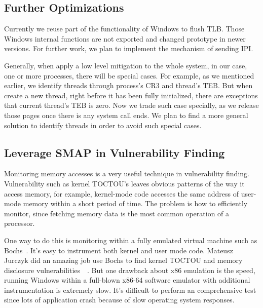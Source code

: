 \begin{comment}
Well known facts about paging on x86 architecture, for each thread, the root of page tables is stored in CR3, by which CPU can translate virtual-physical page mappings automatically in hardware. CR3 are updated by OS thread scheduling code during thread switching. Since we don't want to modify the target operating system, we can use hypervisor to monitoring thread switching events just like what we did for process context switching. There is no direct VM exit event that represent thread switching, but indirectly OS will access certain data structure when scheduling. By monitoring pages that contains certain system data structures, thread switching can be monitored~\cite{pan2017digtool}.
\end{comment}

\subsection{Further Optimizations}
Currently we reuse part of the functionality of Windows to flush TLB. Those Windows internal functions are not exported and changed prototype in newer versions. For further work, we plan to implement the mechanism of sending IPI.

Generally, when apply a low level mitigation to the whole system, in our case, one or more processes, there will be special cases. For example, as we mentioned earlier, we identify threads through process's CR3 and thread's TEB. But when create a new thread, right before it has been fully initialized, there are exceptions that current thread's TEB is zero. Now we trade such case specially, as we release those pages once there is any system call ends. We plan to find a more general solution to identify threads in order to avoid such special cases.  

\subsection{Leverage SMAP in Vulnerability Finding}
Monitoring memory accesses is a very useful technique in vulnerability finding. Vulnerability such as kernel TOCTOU's leaves obvious patterns of the way it access memory, for example, kernel-mode code accesses the same address of user-mode memory within a short period of time. The problem is how to efficiently monitor, since fetching memory data is the most common operation of a processor.

One way to do this is monitoring within a fully emulated virtual machine such as Bochs~\cite{lawton2003bochs}. It's easy to instrument both kernel and user mode code. Mateusz Jurczyk did an amazing job use Bochs to find kernel TOCTOU and memory disclosure vulnerabilities~\cite{jurczyk2013identifying}~\cite{bochspwnreloaded}. But one drawback about x86 emulation is the speed, running Windows within a full-blown x86-64 software emulator with additional instrumentation is extremely slow. It's difficult to perform an comprehensive test since lots of application crash because of slow operating system responses.

